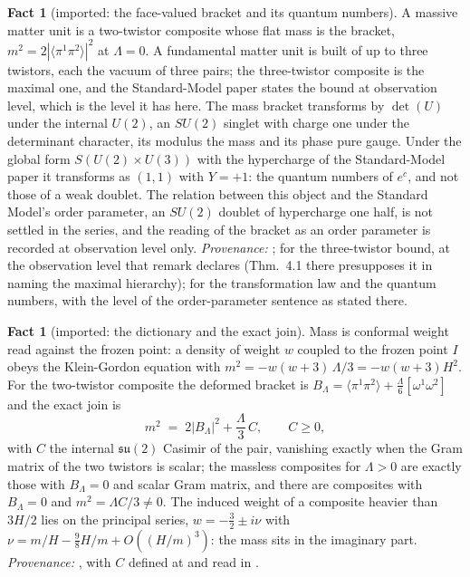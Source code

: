 \documentclass[11pt]{article}
\theoremstyle{definition}
\newtheorem{fact}[theorem]{Fact}
\newcommand{\br}[1]{\langle #1\rangle}
\begin{document}
\begin{fact}[imported: the face-valued bracket and its quantum numbers]\label{fact:bracket}
A massive matter unit is a two-twistor composite whose flat mass is the bracket, $m^{2} = 2|\br{\pi^{1}\pi^{2}}|^{2}$ at $\Lambda = 0$. A fundamental matter unit is built of up to three twistors, each the vacuum of three pairs; the three-twistor composite is the maximal one, and the Standard-Model paper states the bound at observation level, which is the level it has here. The mass bracket transforms by $\det(U)$ under the internal $U(2)$, an $SU(2)$ singlet with charge one under the determinant character, its modulus the mass and its phase pure gauge. Under the global form $S(U(2) \times U(3))$ with the hypercharge of the Standard-Model paper it transforms as $(1,1)$ with $Y = +1$: the quantum numbers of $e^{c}$, and not those of a weak doublet. The relation between this object and the Standard Model's order parameter, an $SU(2)$ doublet of hypercharge one half, is not settled in the series, and the reading of the bracket as an order parameter is recorded at observation level only. \emph{Provenance:} \cite[Prop.~4.1]{ButlerT11}; \cite[Rem.~3.3]{ButlerT12} for the three-twistor bound, at the observation level that remark declares (Thm.~4.1 there presupposes it in naming the maximal hierarchy); \cite[Props.~3.1-3.2]{ButlerT12} for the transformation law and the quantum numbers, with the level of the order-parameter sentence as stated there.
\end{fact}

\begin{fact}[imported: the dictionary and the exact join]\label{fact:dictionary}
Mass is conformal weight read against the frozen point: a density of weight $w$ coupled to the frozen point $I$ obeys the Klein-Gordon equation with $m^{2} = -w(w+3)\,\Lambda/3 = -w(w+3)H^{2}$. For the two-twistor composite the deformed bracket is $B_{\Lambda} = \br{\pi^{1}\pi^{2}} + \tfrac{\Lambda}{6}[\omega^{1}\omega^{2}]$ and the exact join is
\[
m^{2} \;=\; 2|B_{\Lambda}|^{2} + \frac{\Lambda}{3}\,C, \qquad C \ge 0,
\]
with $C$ the internal $\mathfrak{su}(2)$ Casimir of the pair, vanishing exactly when the Gram matrix of the two twistors is scalar; the massless composites for $\Lambda > 0$ are exactly those with $B_{\Lambda} = 0$ and scalar Gram matrix, and there are composites with $B_{\Lambda} = 0$ and $m^{2} = \Lambda C/3 \ne 0$. The induced weight of a composite heavier than $3H/2$ lies on the principal series, $w = -\tfrac32 \pm i\nu$ with $\nu = m/H - \tfrac98 H/m + O((H/m)^{3})$: the mass sits in the imaginary part. \emph{Provenance:} \cite[Thm.~3.1, Thm.~5.6, Prop.~5.9]{ButlerT11}, with $C$ defined at \cite[eq.~(9)]{ButlerT11} and read in \cite[Rem.~5.10]{ButlerT11}.
\end{fact}
\end{document}
